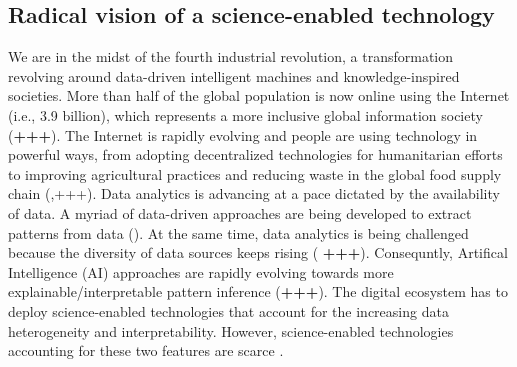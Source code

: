 \documentclass[11pt, a4paper]{article} %
\begin{document}
\subsection{Radical vision of a science-enabled technology}
We are in the midst of the fourth industrial revolution, a
transformation revolving around data-driven intelligent machines and
knowledge-inspired societies. More than half of the global population
is now online using the Internet (i.e., 3.9 billion), which represents
a more inclusive global information society ({\bf +++}). The Internet
is rapidly evolving and people are using technology in powerful ways,
from adopting decentralized technologies for humanitarian efforts to
improving agricultural practices and reducing waste in the global food
supply chain (\citep{Wilson2018},+++). Data analytics is advancing at
a pace dictated by the availability of data. A myriad of data-driven
approaches are being developed to extract patterns from data
(\citep{Schmidhuber:2015}). At the same time, data analytics is being
challenged because the diversity of data sources keeps rising ({\bf
  +++}). Consequntly, Artifical Intelligence (AI) approaches are
rapidly evolving towards more explainable/interpretable pattern
inference ({\bf +++}). The digital ecosystem has to deploy
science-enabled technologies that account for the increasing data
heterogeneity and interpretability. However, science-enabled
technologies accounting for these two features are scarce
\citep{RePEc}.
  
\end{document}
